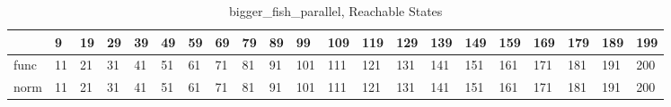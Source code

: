 \begin{table}
\centering
\caption{bigger_fish_parallel, Reachable States}
\label{bigger_fish_parallel_reach}
\begin{tabular}{lllllllllllllllllllll}
\toprule
{} &   9 &  19 &  29 &  39 &  49 &  59 &  69 &  79 &  89 &   99 &  109 &  119 &  129 &  139 &  149 &  159 &  169 &  179 &  189 &  199 \\
\midrule
func &  11 &  21 &  31 &  41 &  51 &  61 &  71 &  81 &  91 &  101 &  111 &  121 &  131 &  141 &  151 &  161 &  171 &  181 &  191 &  200 \\
norm &  11 &  21 &  31 &  41 &  51 &  61 &  71 &  81 &  91 &  101 &  111 &  121 &  131 &  141 &  151 &  161 &  171 &  181 &  191 &  200 \\
\bottomrule
\end{tabular}
\end{table}
